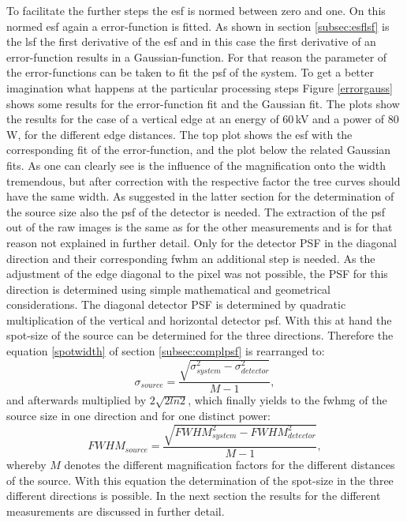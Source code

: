 To facilitate the further steps the \gls{esf} is normed between zero and one. On this normed \gls{esf} again a error-function is fitted. As shown in section \ref{subsec:esflsf} is the \gls{lsf} the first derivative of the \gls{esf} and in this case the first derivative of an error-function results in a Gaussian-function. For that reason the parameter of the error-functions can be taken to fit the \gls{psf} of the system. To get a better imagination what happens at the particular processing steps Figure \ref{errorgauss} shows some results for the error-function fit and the Gaussian fit. The plots show the results for the case of a vertical edge at an energy of $60\,$kV and a power of $80$ W, for the different edge distances. The top plot shows the \gls{esf} with the corresponding fit of the error-function, and the plot below the related Gaussian fits. As one can clearly see is the influence of the magnification onto the width tremendous, but after correction with the respective factor the tree curves should have the same width. As suggested in the latter section for the determination of the source size also the \gls{psf} of the detector is needed. The extraction of the \gls{psf} out of the raw images is the same as for the other measurements and is for that reason not explained in further detail. Only for the detector PSF in the diagonal direction and their corresponding \gls{fwhm} an additional step is needed. As the adjustment of the edge diagonal to the pixel was not possible, the PSF for this direction is determined using simple mathematical and geometrical considerations. The diagonal detector PSF is determined by quadratic multiplication of the vertical and horizontal detector \gls{psf}.   With this at hand the spot-size of the source can be determined for the three directions. Therefore the equation \ref{spotwidth} of section \ref{subsec:complpsf} is rearranged to:
\begin{equation}
\sigma_{source} = \frac{\sqrt{\sigma_{system}^{2}-\sigma_{detector}^{2}}}{M-1},
\end{equation}
and afterwards multiplied by $2\sqrt{2 ln2}$, which finally yields to the \gls{fwhmg} of the source size in one direction and for one distinct power:
\begin{equation}
FWHM_{source} = \frac{\sqrt{FWHM_{system}^{2}-FWHM_{detector}^{2}}}{M-1},
\end{equation}
whereby $M$ denotes the different magnification factors for the different distances of the source. With this equation the determination of the spot-size in the three different directions is possible. In the next section the results for the different measurements are discussed in further detail.      
